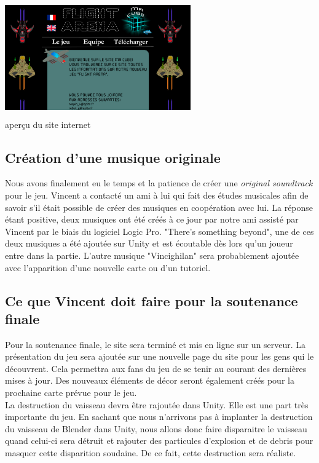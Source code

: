 \documentclass[10pt, titlepage]{report}
\begin{document}
\begin{center}
\includegraphics[height=5cm, width=8cm]{site.png}\\
aperçu du site internet
\end{center}

\subsection{Création d'une musique originale}
Nous avons finalement eu le temps et la patience de créer une \textit{original soundtrack} pour le jeu. Vincent a contacté un ami à lui qui fait des études musicales afin de savoir s'il était possible de créer des musiques en coopération avec lui. La réponse étant positive, deux musiques ont été créés à ce jour par notre ami assisté par Vincent par le biais du logiciel Logic Pro. "There's something beyond", une de ces deux musiques a été ajoutée sur Unity et est écoutable dès lors qu'un joueur entre dans la partie. L'autre musique "Vincighilan" sera probablement ajoutée avec l'apparition d'une nouvelle carte ou d'un tutoriel.

\subsection{Ce que Vincent doit faire pour la soutenance finale}
Pour la soutenance finale, le site sera terminé et mis en ligne sur un serveur. La présentation du jeu sera ajoutée sur une nouvelle page du site pour les gens qui le découvrent. Cela permettra aux fans du jeu de se tenir au courant des dernières mises à jour. Des nouveaux éléments de décor seront également créés pour la prochaine carte prévue pour le jeu.\\

La destruction du vaisseau devra être rajoutée dans Unity. Elle est une part très importante du jeu. En sachant que nous n'arrivons pas à implanter la destruction du vaisseau de Blender dans Unity, nous allons donc faire disparaitre le vaisseau quand celui-ci sera détruit et rajouter des particules d'explosion et de debris pour masquer cette disparition soudaine. De ce fait, cette destruction sera réaliste.\\
\end{document}
